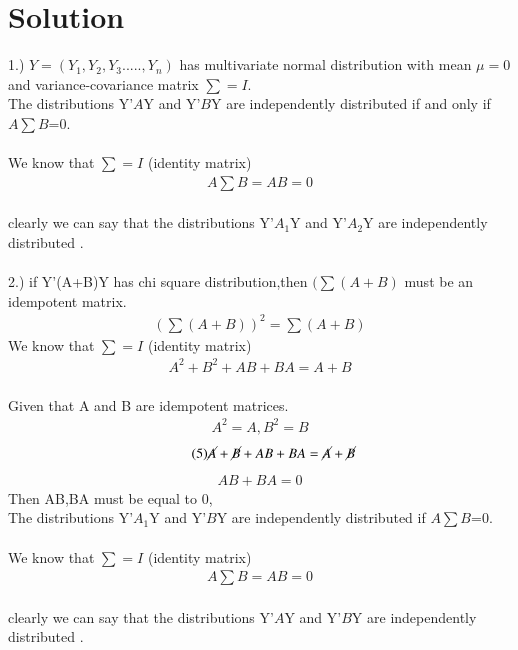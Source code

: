 \documentclass[journal,12pt,twocolumn]{IEEEtran}
\begin{document}
\section*{Solution}
1.) $Y=(Y_1,Y_2,Y_3.....,Y_n)$ has multivariate normal distribution with mean $\mu=0$ and variance-covariance matrix $\sum=I$.\\
The distributions Y'$A$Y and  Y'$B$Y  are independently distributed if and only if $A\sum B$=0.\\
 \\We know that $\sum=I$ (identity matrix)
 \begin{align}
 \tag{1}
 A \textstyle \sum B=AB=0
   \end{align}
  \\ clearly we can say that the  distributions Y'$A_1$Y and  Y'$A_2$Y  are independently distributed .\\
\\2.) if Y'(A+B)Y has chi square distribution,then $(\sum(A+B)$ must be an idempotent matrix.\\
  \begin{align}
 \tag{2}
 (\textstyle \sum(A+B))^2=\sum(A+B) \label{eq:1} 
  \end{align}
   We know that $\sum=I$ (identity matrix)
    \begin{align}
 \tag{3}
  A^2+B^2+AB+BA=A+B \label{eq:1} 
  \end{align}
  \\Given that A and B are idempotent matrices.
    \begin{align}
 \tag{4}
 A^2=A ,B^2=B \label{eq:1} 
  \end{align}
   \begin{align}
 \tag{5}
 \cancel{A}+\cancel{B}+AB+BA=\cancel{A}+\cancel{B}\label{eq:1} 
  \end{align}
  \begin{align}
 \tag{5}
 AB+BA=0 \label{eq:1} 
  \end{align}
 Then AB,BA must be equal to 0,\\
The distributions Y'$A_1$Y and  Y'$B$Y  are independently distributed if $A\sum B$=0.\\
 \\We know that $\sum=I$ (identity matrix)
 \begin{align}
 \tag{6}
 A \textstyle \sum B=AB=0
   \end{align}
  \\ clearly we can say that the distributions Y'$A$Y and  Y'$B$Y  are independently distributed .\\
\end{document}
